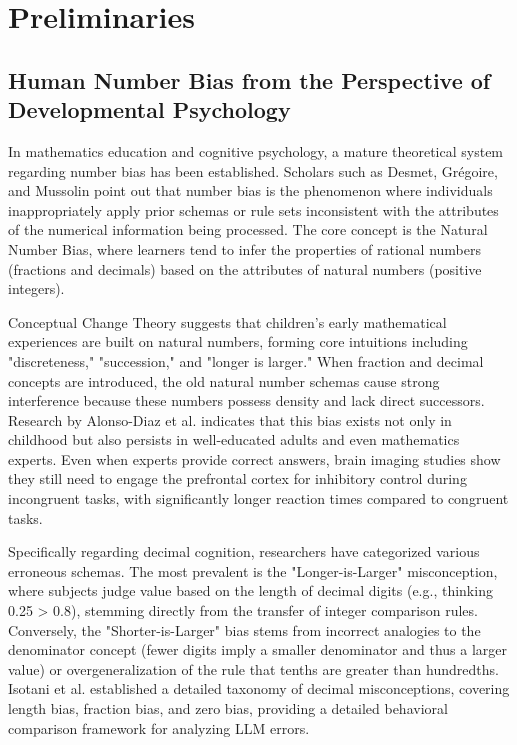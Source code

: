 \section{Preliminaries}

\subsection{Human Number Bias from the Perspective of Developmental Psychology}

In mathematics education and cognitive psychology, a mature theoretical system regarding number bias has been established. Scholars such as Desmet, Grégoire, and Mussolin point out that number bias is the phenomenon where individuals inappropriately apply prior schemas or rule sets inconsistent with the attributes of the numerical information being processed\cite{desmet2010}. The core concept is the Natural Number Bias, where learners tend to infer the properties of rational numbers (fractions and decimals) based on the attributes of natural numbers (positive integers).

Conceptual Change Theory suggests that children's early mathematical experiences are built on natural numbers, forming core intuitions including "discreteness," "succession," and "longer is larger." When fraction and decimal concepts are introduced, the old natural number schemas cause strong interference because these numbers possess density and lack direct successors. Research by Alonso-Diaz et al. indicates that this bias exists not only in childhood but also persists in well-educated adults and even mathematics experts\cite{alonsodaz2018}. Even when experts provide correct answers, brain imaging studies show they still need to engage the prefrontal cortex for inhibitory control during incongruent tasks, with significantly longer reaction times compared to congruent tasks.

Specifically regarding decimal cognition, researchers have categorized various erroneous schemas. The most prevalent is the "Longer-is-Larger" misconception, where subjects judge value based on the length of decimal digits (e.g., thinking 0.25 > 0.8), stemming directly from the transfer of integer comparison rules. Conversely, the "Shorter-is-Larger" bias stems from incorrect analogies to the denominator concept (fewer digits imply a smaller denominator and thus a larger value) or overgeneralization of the rule that tenths are greater than hundredths. Isotani et al. established a detailed taxonomy of decimal misconceptions, covering length bias, fraction bias, and zero bias\cite{roell2017}, providing a detailed behavioral comparison framework for analyzing LLM errors.

